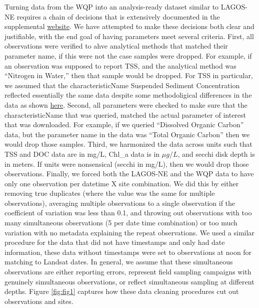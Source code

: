 \documentclass[]{article}
\begin{document}
Turning data from the WQP into an analysis-ready dataset similar to
LAGOS-NE requires a chain of decisions that is extensively documented in
the supplemental \href{link}{website}. We have attempted to make these
decisions both clear and justifiable, with the end goal of having
parameters meet several criteria. First, all observations were verified
to ahve analytical methods that matched their parameter name, if this
were not the case samples were dropped. For example, if an observation
was supposed to report TSS, and the analytical method was ``Nitrogen in
Water,'' then that sample would be dropped. For TSS in particular, we
assumed that the characteristicName Suspended Sediment Concentration
reflected essentially the same data despite some methodoligical
differences in the data as shown
\href{https://water.usgs.gov/osw/pubs/WRIR00-4191.pdf}{here}. Second,
all parameters were checked to make sure that the characteristicName
that was queried, matched the actual parameter of interest that was
downloaded. For example, if we queried ``Dissolved Organic Carbon''
data, but the parameter name in the data was ``Total Organic Carbon''
then we would drop those samples. Third, we harmonized the data across
units such that TSS and DOC data are in mg/L, Chl\_a data is in
\(\mu g/L\), and secchi disk depth is in meters. If units were
nonsensical (secchi in mg/L), then we would drop those observations.
Finally, we forced both the LAGOS-NE and the WQP data to have only one
observation per datetime X site combination. We did this by either
removing true duplicates (where the value was the same for multiple
observations), averaging multiple observations to a single observation
if the coefficient of variation was less than 0.1, and throwing out
observations with too many simultaneous observations (5 per date time
combination) or too much variation with no metadata explaining the
repeat observations. We used a similar procedure for the data that did
not have timestamps and only had date information, these data without
timestamps were set to observations at noon for matching to Landsat
dates. In general, we assume that these simultaneous observations are
either reporting errors, represent field sampling campaigns with
genuinely simultaneous observations, or reflect simultaneous sampling at
different depths. Figure \ref{fig:fig1} captures how these data cleaning
procedures cut out observations and sites.
\end{document}
